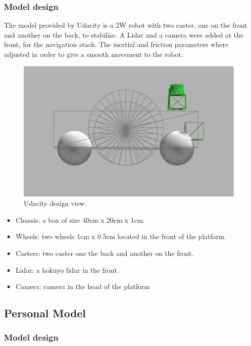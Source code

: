 \documentclass[10pt,journal,compsoc]{IEEEtran}
\begin{document}
\subsubsection{Model design}

The model provided by Udacity is a 2W robot with two caster, one on the front and another on the back, to stabilise. A Lidar and a camera were added at the front, for the navigation stack. The inertial and friction parameters where adjusted in order to give a smooth movement to the robot.

\begin{figure}[h]
\centering
\includegraphics[scale=0.33]{udacity-design-2}
\caption{Udacity design view.}
\label{fig:mesh1}
\end{figure}

\begin{itemize}
\item Chassis: a box of size 40cm x 20cm x 1cm.
\item Wheels: two wheels 1cm x 0.5cm located in the front of the platform.
\item Casters: two caster one the back and another on the front.
\item Lidar: a hokuyo lidar in the front.
\item Camera: camera in the head of the platform
\end{itemize}


\subsection{Personal Model}

\subsubsection{Model design}
\end{document}
